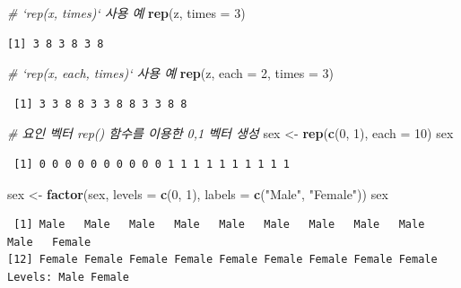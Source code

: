\documentclass[11pt,a4paper]{book}
\newenvironment{Shaded}{\begin{snugshade}}{\end{snugshade}}
\newcommand{\KeywordTok}[1]{\textcolor[rgb]{0.13,0.29,0.53}{\textbf{#1}}}
\newcommand{\DataTypeTok}[1]{\textcolor[rgb]{0.13,0.29,0.53}{#1}}
\newcommand{\DecValTok}[1]{\textcolor[rgb]{0.00,0.00,0.81}{#1}}
\newcommand{\StringTok}[1]{\textcolor[rgb]{0.31,0.60,0.02}{#1}}
\newcommand{\CommentTok}[1]{\textcolor[rgb]{0.56,0.35,0.01}{\textit{#1}}}
\newcommand{\NormalTok}[1]{#1}
\theoremstyle{definition}
\theoremstyle{definition}
\theoremstyle{definition}
\theoremstyle{remark}
\begin{document}
\begin{Shaded}
\begin{Highlighting}[]
\CommentTok{# `rep(x, times)` 사용 예}
\KeywordTok{rep}\NormalTok{(z, }\DataTypeTok{times =} \DecValTok{3}\NormalTok{)}
\end{Highlighting}
\end{Shaded}

\begin{verbatim}
[1] 3 8 3 8 3 8
\end{verbatim}

\begin{Shaded}
\begin{Highlighting}[]
\CommentTok{# `rep(x, each, times)` 사용 예}
\KeywordTok{rep}\NormalTok{(z, }\DataTypeTok{each =} \DecValTok{2}\NormalTok{, }\DataTypeTok{times =} \DecValTok{3}\NormalTok{)}
\end{Highlighting}
\end{Shaded}

\begin{verbatim}
 [1] 3 3 8 8 3 3 8 8 3 3 8 8
\end{verbatim}

\begin{Shaded}
\begin{Highlighting}[]
\CommentTok{# 요인 벡터 rep() 함수를 이용한 0,1 벡터 생성}
\NormalTok{sex <-}\StringTok{ }\KeywordTok{rep}\NormalTok{(}\KeywordTok{c}\NormalTok{(}\DecValTok{0}\NormalTok{, }\DecValTok{1}\NormalTok{), }\DataTypeTok{each =} \DecValTok{10}\NormalTok{)}
\NormalTok{sex}
\end{Highlighting}
\end{Shaded}

\begin{verbatim}
 [1] 0 0 0 0 0 0 0 0 0 0 1 1 1 1 1 1 1 1 1 1
\end{verbatim}

\begin{Shaded}
\begin{Highlighting}[]
\NormalTok{sex <-}\StringTok{ }\KeywordTok{factor}\NormalTok{(sex, }\DataTypeTok{levels =} \KeywordTok{c}\NormalTok{(}\DecValTok{0}\NormalTok{, }\DecValTok{1}\NormalTok{), }\DataTypeTok{labels =} \KeywordTok{c}\NormalTok{(}\StringTok{"Male"}\NormalTok{, }\StringTok{"Female"}\NormalTok{))}
\NormalTok{sex}
\end{Highlighting}
\end{Shaded}

\begin{verbatim}
 [1] Male   Male   Male   Male   Male   Male   Male   Male   Male   Male   Female
[12] Female Female Female Female Female Female Female Female Female
Levels: Male Female
\end{verbatim}
\end{document}
